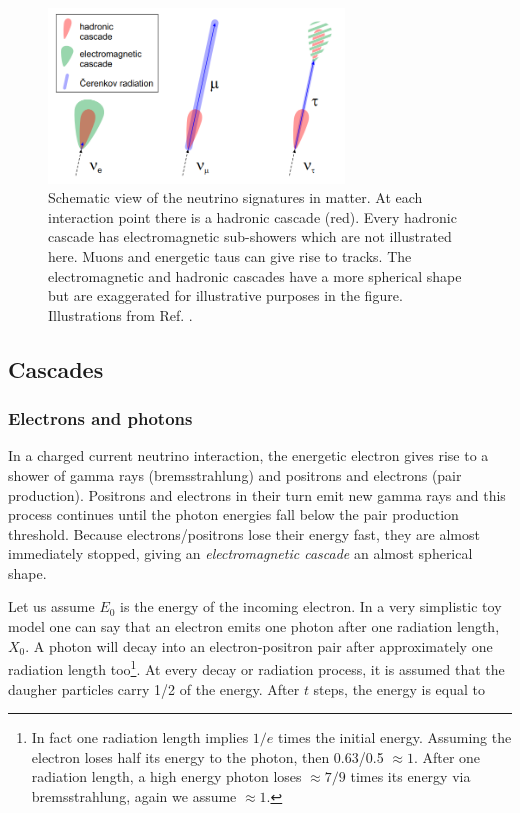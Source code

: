 \begin{figure}[t]
\centering
\includegraphics[width=0.7\textwidth]{chapter4/img/ICinteractions.png}
\caption{Schematic view of the neutrino signatures in matter. At each interaction point there is a hadronic cascade (red). Every hadronic cascade has electromagnetic sub-showers which are not illustrated here. Muons and energetic taus can give rise to tracks. The electromagnetic and hadronic cascades have a more spherical shape but are exaggerated for illustrative purposes in the figure. Illustrations from Ref. \cite{Wallraff}.}
\label{fig:ICinteractions}
\end{figure}

\subsection{Cascades}
\subsubsection{Electrons and photons}

In a charged current neutrino interaction, the energetic electron gives rise to a shower of gamma rays (bremsstrahlung) and positrons and electrons (pair production). Positrons and electrons in their turn emit new gamma rays and this process continues until the photon energies fall below the pair production threshold. Because electrons/positrons lose their energy fast, they are almost immediately stopped, giving an \textit{electromagnetic cascade} an almost spherical shape.

Let us assume $E_0$ is the energy of the incoming electron. In a very simplistic toy model one can say that an electron emits one photon after one radiation length, $X_0$. A photon will decay into an electron-positron pair after approximately one radiation length too\footnote{In fact one radiation length implies $1/e$ times the initial energy. Assuming the electron loses half its energy to the photon, then 0.63/0.5 $\approx 1$. After one radiation length, a high energy photon loses $\approx 7/9$ times its energy via bremsstrahlung, again we assume $\approx 1$.}. At every decay or radiation process, it is assumed that the daugher particles carry 1/2 of the energy. After $t$ steps, the energy is equal to

